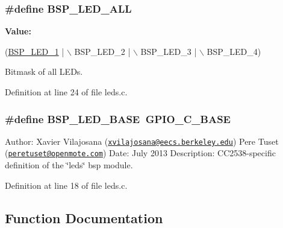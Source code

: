 \subsubsection[{\texorpdfstring{B\+S\+P\+\_\+\+L\+E\+D\+\_\+\+A\+LL}{BSP_LED_ALL}}]{\setlength{\rightskip}{0pt plus 5cm}\#define B\+S\+P\+\_\+\+L\+E\+D\+\_\+\+A\+LL}\hypertarget{_open_mote-_c_c2538_2leds_8c_ac3a9220505503270dec2befe8b73846a}{}\label{_open_mote-_c_c2538_2leds_8c_ac3a9220505503270dec2befe8b73846a}
{\bfseries Value\+:}
\begin{DoxyCode}
(\hyperlink{_open_mote-_c_c2538_2leds_8c_ac735bbacfdc0829d717c2968d355e016}{BSP\_LED\_1} | \(\backslash\)
                                 BSP\_LED\_2 | \(\backslash\)
                                 BSP\_LED\_3 | \(\backslash\)
                                 BSP\_LED\_4)
\end{DoxyCode}


Bitmask of all L\+E\+Ds. 



Definition at line 24 of file leds.\+c.

\subsubsection[{\texorpdfstring{B\+S\+P\+\_\+\+L\+E\+D\+\_\+\+B\+A\+SE}{BSP_LED_BASE}}]{\setlength{\rightskip}{0pt plus 5cm}\#define B\+S\+P\+\_\+\+L\+E\+D\+\_\+\+B\+A\+SE~{\bf G\+P\+I\+O\+\_\+\+C\+\_\+\+B\+A\+SE}}\hypertarget{_open_mote-_c_c2538_2leds_8c_ac0949598ab8ed4fcb4210e1d70edfeb4}{}\label{_open_mote-_c_c2538_2leds_8c_ac0949598ab8ed4fcb4210e1d70edfeb4}
Author\+: Xavier Vilajosana (\href{mailto:xvilajosana@eecs.berkeley.edu}{\tt xvilajosana@eecs.\+berkeley.\+edu}) Pere Tuset (\href{mailto:peretuset@openmote.com}{\tt peretuset@openmote.\+com}) Date\+: July 2013 Description\+: C\+C2538-\/specific definition of the \char`\"{}leds\char`\"{} bsp module. 

Definition at line 18 of file leds.\+c.



\subsection{Function Documentation}
